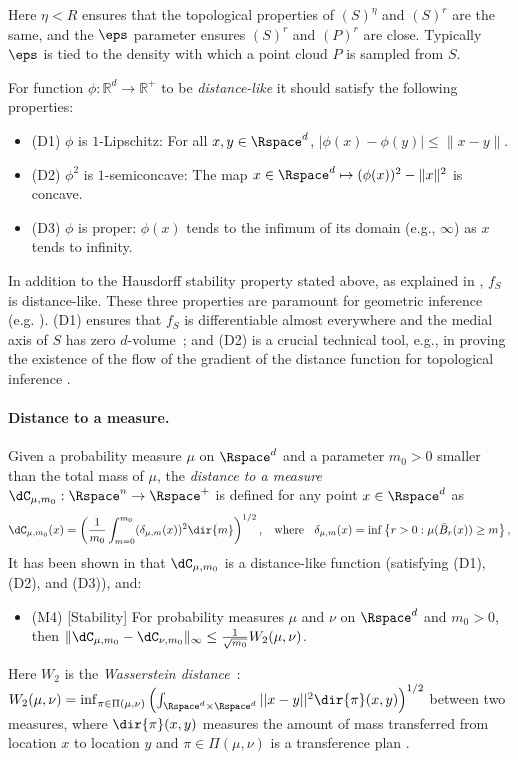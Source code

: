 \documentclass[11pt]{myclass}
\begin{document}
Here $\eta < R$ ensures that the topological properties of $(S)^\eta$ and $(S)^r$ are the same, and the $\eps$ parameter ensures $(S)^r$ and $(P)^r$ are close.  
Typically $\eps$ is tied to the density with which a point cloud $P$ is sampled from $S$.  

For function $\phi : \mathbb{R}^d \to \mathbb{R}^+$ to be \emph{distance-like} it should satisfy the following properties:
\begin{itemize} \denselist
\item (D1)  $\phi$ is $1$-Lipschitz:  For all $x,y \in \Rspace^d$, $|\phi(x) - \phi(y)| \leq \|x-y\|$.  
\item (D2)  $\phi^2$ is $1$-semiconcave:  The map $x \in \Rspace^d \mapsto (\phi(x))^2 - \|x\|^2$ is concave.  
\item (D3)   $\phi$ is proper: $\phi(x)$ tends to the infimum of its domain (e.g., $\infty$) as $x$ tends to infinity.  
\end{itemize}
In addition to the Hausdorff stability property stated above, as explained in \cite{ChazalCohen-SteinerMerigot2011}, $f_S$ is distance-like.  These three properties are paramount for geometric inference (e.g. \cite{ChazalCohen-SteinerLieutier2009,Lieutier2004}).  
(D1) ensures that $f_S$ is differentiable almost everywhere and the medial axis of $S$ has zero $d$-volume~\cite{ChazalCohen-SteinerMerigot2011}; and (D2) is a crucial technical tool, e.g., in proving the existence of the flow of the gradient of the distance function for topological inference \cite{ChazalCohen-SteinerLieutier2009}. 




\paragraph{Distance to a measure.}
Given a probability measure $\mu$ on $\Rspace^d$ and a parameter $m_0 > 0$ smaller than the total mass of $\mu$,
the \emph{distance to a measure} $\dC_{\mu,m_0}: \Rspace^n \to \Rspace^+$ \cite{ChazalCohen-SteinerMerigot2011} is defined for any point $x \in \Rspace^d$ as 
\[
\dC_{\mu, m_0}(x) = \left(\frac{1}{m_0} \int_{m = 0}^{m_0} (\delta_{\mu,m}(x))^2 \dir{m}\right)^{1/2},
\;\; \text{ where } \;\;
\delta_{\mu,m}(x) = \inf \left\{r > 0 :  \mu(\bar{B}_r(x)) \geq m \right\},
\]
It has been shown in \cite{ChazalCohen-SteinerMerigot2011} that $\dC_{\mu, m_0}$ is a distance-like function (satisfying (D1), (D2), and (D3)), and:
\begin{itemize} 
\item (M4)   [Stability] For probability measures $\mu$ and $\nu$ on $\Rspace^d$ and $m_0>0$, then $\| \dC_{\mu, m_0} - \dC_{\nu,m_0}\|_{\infty} \leq \frac{1}{\sqrt{m_0}} W_2 (\mu, \nu)$.
\end{itemize}
Here $W_2$ is the \emph{Wasserstein distance}~\cite{Villani2003}:  
$
W_2(\mu, \nu) = \inf_{\pi \in \Pi(\mu,\nu)} \left( \int_{\Rspace^d \times \Rspace^d}||x-y||^2 \dir{\pi}(x,y) \right)^{1/2}
$
between two measures, where $\dir{\pi}(x,y)$ measures the amount of mass transferred from location $x$ to location $y$ and $\pi \in \Pi(\mu, \nu)$ is a transference plan \cite{Villani2003}.  
\end{document}
